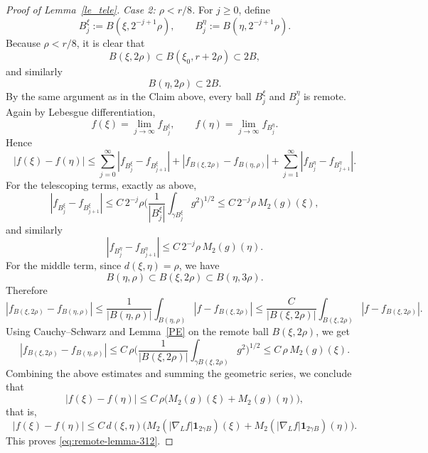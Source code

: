 \documentclass[12pt]{amsart}
\begin{document}
\begin{proof}[Proof of Lemma~\ref{le_tele}]
\textit{Case 2: $\rho< r/8$.}
For $j\ge0$, define
\[
B_j^\xi:=B(\xi,2^{-j+1}\rho),
\qquad
B_j^\eta:=B(\eta,2^{-j+1}\rho).
\]
Because $\rho<r/8$, it is clear that
\[
B(\xi,2\rho)\subset B(\xi_0,r+2\rho)\subset 2B,
\]
and similarly
\[
B(\eta,2\rho)\subset 2B.
\]
By the same argument as in the Claim above, every ball $B_j^\xi$ and $B_j^\eta$ is remote. Again by Lebesgue differentiation,
\[
f(\xi)=\lim_{j\to\infty} f_{B_j^\xi},
\qquad
f(\eta)=\lim_{j\to\infty} f_{B_j^\eta}.
\]
Hence
\[
|f(\xi)-f(\eta)|
\le
\sum_{j=0}^\infty |f_{B_j^\xi}-f_{B_{j+1}^\xi}|
+
|f_{B(\xi,2\rho)}-f_{B(\eta,\rho)}|
+
\sum_{j=1}^\infty |f_{B_j^\eta}-f_{B_{j+1}^\eta}|.
\]
For the telescoping terms, exactly as above,
\[
|f_{B_j^\xi}-f_{B_{j+1}^\xi}|
\le
C\, 2^{-j}\rho \biggl(\frac{1}{|B_j^\xi|}\int_{\gamma B_j^\xi} g^2\biggr)^{\!1/2}
\le
C\, 2^{-j}\rho\, M_2(g)(\xi),
\]
and similarly
\[
|f_{B_j^\eta}-f_{B_{j+1}^\eta}|
\le
C\, 2^{-j}\rho\, M_2(g)(\eta).
\]
For the middle term, since $d(\xi,\eta)=\rho$, we have
\[
B(\eta,\rho)\subset B(\xi,2\rho) \subset B(\eta,3\rho).
\]
Therefore
\[
|f_{B(\xi,2\rho)}-f_{B(\eta,\rho)}|
\le
\frac{1}{|B(\eta,\rho)|}\int_{B(\eta,\rho)} |f-f_{B(\xi,2\rho)}|
\le
\frac{C}{|B(\xi,2\rho)|} \int_{B(\xi,2\rho)} |f-f_{B(\xi,2\rho)}|.
\]
Using Cauchy--Schwarz and Lemma~\ref{PE} on the remote ball $B(\xi,2\rho)$, we get
\[
|f_{B(\xi,2\rho)}-f_{B(\eta,\rho)}|
\le
C\, \rho\biggl( \frac{1}{|B(\xi,2\rho)|}\int_{\gamma B(\xi,2\rho)} g^2\biggr)^{\!1/2}
\le
C\, \rho\, M_2(g)(\xi).
\]
Combining the above estimates and summing the geometric series, we conclude that
\[
|f(\xi)-f(\eta)|
\le
C\, \rho\bigl(M_2(g)(\xi)+M_2(g)(\eta)\bigr),
\]
that is,
\[
|f(\xi)-f(\eta)|
\le
C\, d(\xi,\eta)\bigl(M_2(|\nabla_L f|\mathbf{1}_{2\gamma B})(\xi)+M_2(|\nabla_L f|\mathbf{1}_{2\gamma B})(\eta)\bigr).
\]
This proves \eqref{eq:remote-lemma-312}.
\end{proof}
\end{document}
